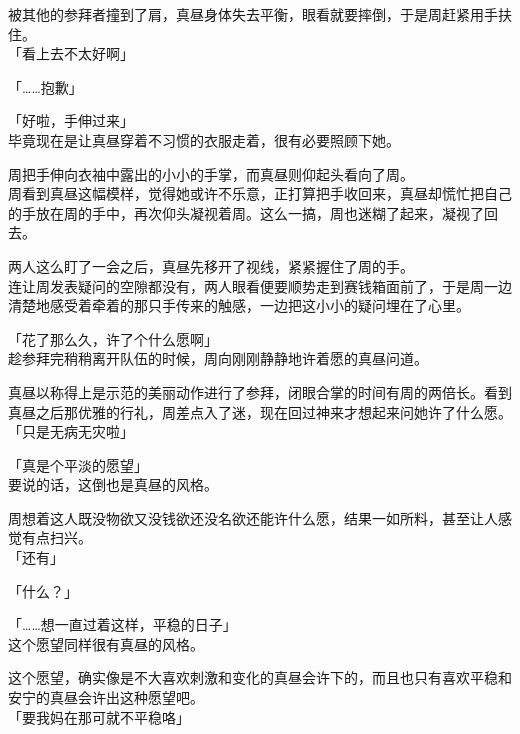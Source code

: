 被其他的参拜者撞到了肩，真昼身体失去平衡，眼看就要摔倒，于是周赶紧用手扶住。\\

「看上去不太好啊」

「……抱歉」

「好啦，手伸过来」\\

毕竟现在是让真昼穿着不习惯的衣服走着，很有必要照顾下她。

周把手伸向衣袖中露出的小小的手掌，而真昼则仰起头看向了周。\\

周看到真昼这幅模样，觉得她或许不乐意，正打算把手收回来，真昼却慌忙把自己的手放在周的手中，再次仰头凝视着周。这么一搞，周也迷糊了起来，凝视了回去。

两人这么盯了一会之后，真昼先移开了视线，紧紧握住了周的手。\\

连让周发表疑问的空隙都没有，两人眼看便要顺势走到赛钱箱面前了，于是周一边清楚地感受着牵着的那只手传来的触感，一边把这小小的疑问埋在了心里。\\

\vspace{2\baselineskip}

「花了那么久，许了个什么愿啊」\\

趁参拜完稍稍离开队伍的时候，周向刚刚静静地许着愿的真昼问道。

真昼以称得上是示范的美丽动作进行了参拜，闭眼合掌的时间有周的两倍长。看到真昼之后那优雅的行礼，周差点入了迷，现在回过神来才想起来问她许了什么愿。\\

「只是无病无灾啦」

「真是个平淡的愿望」\\

要说的话，这倒也是真昼的风格。

周想着这人既没物欲又没钱欲还没名欲还能许什么愿，结果一如所料，甚至让人感觉有点扫兴。\\

「还有」

「什么？」

「……想一直过着这样，平稳的日子」\\

这个愿望同样很有真昼的风格。

这个愿望，确实像是不大喜欢刺激和变化的真昼会许下的，而且也只有喜欢平稳和安宁的真昼会许出这种愿望吧。\\

「要我妈在那可就不平稳咯」

